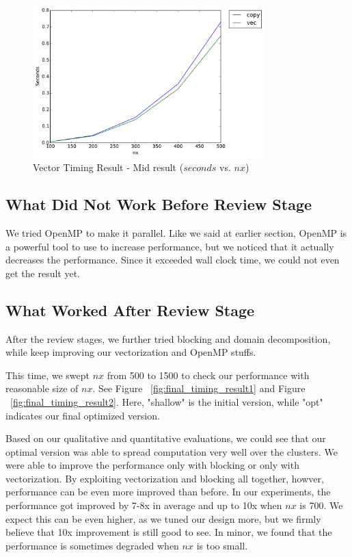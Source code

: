 \begin{figure}[h]
    \centering
    \includegraphics[width=0.8\textwidth]{figs/vec-timing2.pdf}
    \caption{Vector Timing Result - Mid result  ($seconds$ vs. $nx$)}
    \label{fig:vector_timing_result2}
\end{figure}

\subsection{What Did Not Work Before Review Stage}
We tried OpenMP to make it parallel. Like we said at earlier section, OpenMP is
a powerful tool to use to increase performance, but we noticed that it actually
decreases the performance. Since it exceeded wall clock time, we could not even
get the result yet.

\subsection{What Worked After Review Stage}
After the review stages, we further tried blocking and domain decomposition,
while keep improving our vectorization and OpenMP stuffs.

This time, we swept $ nx $ from 500 to 1500 to check our performance with
reasonable size of $ nx $. See Figure ~\ref{fig:final_timing_result1} and
Figure ~\ref{fig:final_timing_result2}. Here, "shallow" is the initial version,
while "opt" indicates our final optimized version.

Based on our qualitative and quantitative evaluations, we could see that our
optimal version was able to spread computation very well over the clusters. We
were able to improve the performance only with blocking or only with
vectorization. By exploiting vectorization and blocking all together, howver,
performance can be even more improved than before. In our experiments, the
performance got improved by 7-8x in average and up to 10x when $ nx $ is 700.
We expect this can be even higher, as we tuned our design more, but we firmly
believe that 10x improvement is still good to see. In minor, we found that the
performance is sometimes degraded when $ nx $ is too small.

